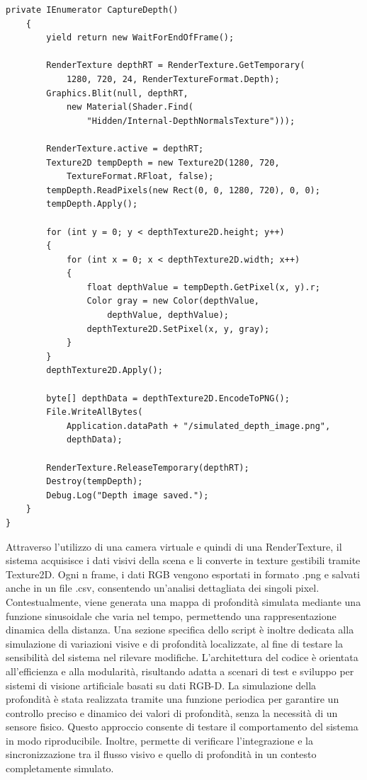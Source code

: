 \documentclass[11pt]{report}
\begin{document}
\begin{lstlisting}[caption=Script base di acquisizione immagini, label=lst:base, lineskip=0.3em]
    private IEnumerator CaptureDepth()
    {
        yield return new WaitForEndOfFrame();
        
        RenderTexture depthRT = RenderTexture.GetTemporary(
            1280, 720, 24, RenderTextureFormat.Depth);
        Graphics.Blit(null, depthRT, 
            new Material(Shader.Find(
                "Hidden/Internal-DepthNormalsTexture")));
        
        RenderTexture.active = depthRT;
        Texture2D tempDepth = new Texture2D(1280, 720, 
            TextureFormat.RFloat, false);
        tempDepth.ReadPixels(new Rect(0, 0, 1280, 720), 0, 0);
        tempDepth.Apply();

        for (int y = 0; y < depthTexture2D.height; y++)
        {
            for (int x = 0; x < depthTexture2D.width; x++)
            {
                float depthValue = tempDepth.GetPixel(x, y).r;
                Color gray = new Color(depthValue, 
                    depthValue, depthValue);
                depthTexture2D.SetPixel(x, y, gray);
            }
        }
        depthTexture2D.Apply();

        byte[] depthData = depthTexture2D.EncodeToPNG();
        File.WriteAllBytes(
            Application.dataPath + "/simulated_depth_image.png", 
            depthData);

        RenderTexture.ReleaseTemporary(depthRT);
        Destroy(tempDepth);
        Debug.Log("Depth image saved.");
    }
}
\end{lstlisting}
\vspace{1em} %
Attraverso l'utilizzo di una camera virtuale e quindi di una RenderTexture, il sistema acquisisce i dati visivi della scena e li converte in texture gestibili tramite Texture2D.
Ogni n frame, i dati RGB vengono esportati in formato .png e salvati anche in un file .csv, consentendo un'analisi dettagliata dei singoli pixel. Contestualmente, viene generata una mappa di profondità simulata mediante una funzione sinusoidale che varia nel tempo, permettendo una rappresentazione dinamica della distanza. Una sezione specifica dello script è inoltre dedicata alla simulazione di variazioni visive e di profondità localizzate, al fine di testare la sensibilità del sistema nel rilevare modifiche. L’architettura del codice è orientata all’efficienza e alla modularità, risultando adatta a scenari di test e sviluppo per sistemi di visione artificiale basati su dati RGB-D.
La simulazione della profondità è stata realizzata tramite una funzione periodica per garantire un controllo preciso e dinamico dei valori di profondità, senza la necessità di un sensore fisico. Questo approccio consente di testare il comportamento del sistema in modo riproducibile. Inoltre, permette di verificare l’integrazione e la sincronizzazione tra il flusso visivo e quello di profondità in un contesto completamente simulato.
\end{document}
